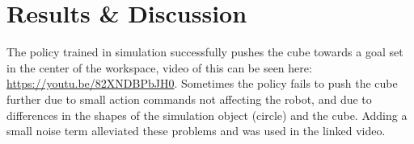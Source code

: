 \section{Results \& Discussion}

The policy trained in simulation successfully pushes the cube towards a goal
set in the center of the workspace, video of this can be seen here:
\url{https://youtu.be/82XNDBPbJH0}. Sometimes the policy fails to push the cube
further due to small action commands not affecting the robot, and due to
differences in the shapes of the simulation object (circle) and the cube.
Adding a small noise term alleviated these problems and was used in the linked
video.
